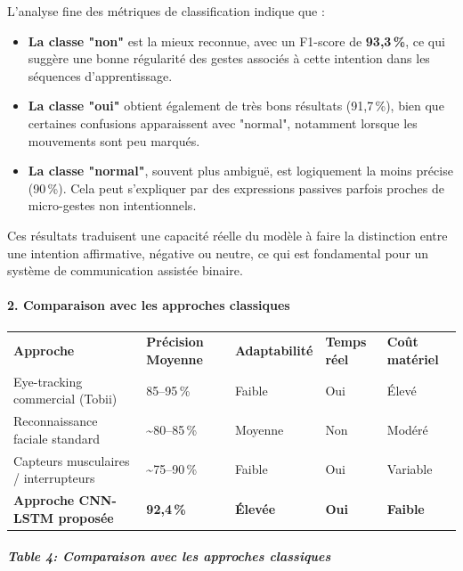 \documentclass[
]{article}
\begin{document}
L'analyse fine des métriques de classification indique que :

\begin{itemize}
\item
  \textbf{La classe "non"} est la mieux reconnue, avec un F1-score de \textbf{93,3\,\%}, ce qui suggère une bonne régularité des gestes associés à cette intention dans les séquences d'apprentissage.
\item
  \textbf{La classe "oui"} obtient également de très bons résultats (91,7\,\%), bien que certaines confusions apparaissent avec "normal", notamment lorsque les mouvements sont peu marqués.
\item
  \textbf{La classe "normal"}, souvent plus ambiguë, est logiquement la moins précise (90\,\%). Cela peut s'expliquer par des expressions passives parfois proches de micro-gestes non intentionnels.
\end{itemize}

Ces résultats traduisent une capacité réelle du modèle à faire la distinction entre une intention affirmative, négative ou neutre, ce qui est fondamental pour un système de communication assistée binaire.

\hypertarget{comparaison-avec-les-approches-classiques}{%
\paragraph{\texorpdfstring{\textbf{2. Comparaison avec les approches classiques}}{2. Comparaison avec les approches classiques}}\label{comparaison-avec-les-approches-classiques}}

\begin{longtable}[]{@{}lllll@{}}
\toprule
\endhead
\textbf{Approche} & \textbf{Précision Moyenne} & \textbf{Adaptabilité} & \textbf{Temps réel} & \textbf{Coût matériel} \\
Eye-tracking commercial (Tobii) & 85--95\,\% & Faible & Oui & Élevé \\
Reconnaissance faciale standard & \textasciitilde80--85\,\% & Moyenne & Non & Modéré \\
Capteurs musculaires / interrupteurs & \textasciitilde75--90\,\% & Faible & Oui & Variable \\
\textbf{Approche CNN-LSTM proposée} & \textbf{92,4\,\%} & \textbf{Élevée} & \textbf{Oui} & \textbf{Faible} \\
\bottomrule
\end{longtable}

\hypertarget{table-4-comparaison-avec-les-approches-classiques}{%
\subparagraph{Table 4: Comparaison avec les approches classiques}\label{table-4-comparaison-avec-les-approches-classiques}}
\end{document}
